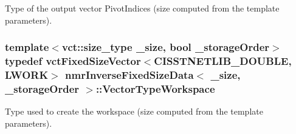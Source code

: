 Type of the output vector Pivot\-Indices (size computed from the template parameters). \hypertarget{classnmr_inverse_fixed_size_data_ac3e08c421f20d9f34917b2cdc03f3b34}{
\subsubsection[{Vector\-Type\-Workspace}]{\setlength{\rightskip}{0pt plus 5cm}template$<$vct\-::size\-\_\-type \-\_\-size, bool \-\_\-storage\-Order$>$ typedef {\bf vct\-Fixed\-Size\-Vector}$<$C\-I\-S\-S\-T\-N\-E\-T\-L\-I\-B\-\_\-\-D\-O\-U\-B\-L\-E, {\bf L\-W\-O\-R\-K}$>$ {\bf nmr\-Inverse\-Fixed\-Size\-Data}$<$ \-\_\-size, \-\_\-storage\-Order $>$\-::{\bf Vector\-Type\-Workspace}}}\label{classnmr_inverse_fixed_size_data_ac3e08c421f20d9f34917b2cdc03f3b34}
Type used to create the workspace (size computed from the template parameters). 

